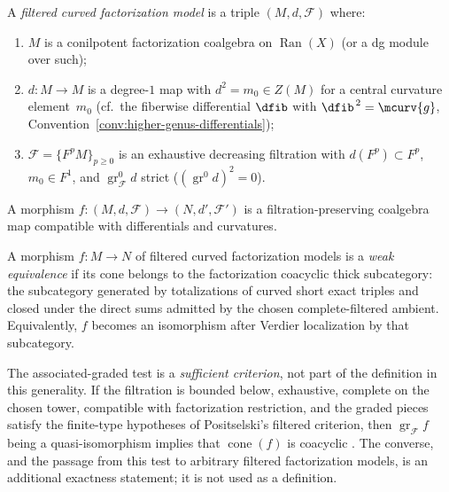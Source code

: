 \begin{definition}
\label{def:filtered-curved-model}
A \emph{filtered curved factorization model} is a triple
$(M, d, \mathcal{F})$ where:
\begin{enumerate}[label=\textup{(\roman*)}]
\item $M$ is a conilpotent factorization coalgebra on $\operatorname{Ran}(X)$
 (or a dg module over such);
\item $d \colon M \to M$ is a degree-$1$ map with
 $d^2 = m_0 \in Z(M)$ for a central curvature element~$m_0$
 (cf.\ the fiberwise differential $\dfib$ with $\dfib^{\,2} = \mcurv{g}$,
 Convention~\textup{\ref{conv:higher-genus-differentials}});
\item $\mathcal{F} = \{F^p M\}_{p \geq 0}$ is an exhaustive
 decreasing filtration with $d(F^p) \subset F^p$,
 $m_0 \in F^1$, and $\operatorname{gr}^0_{\mathcal{F}} d$ strict
 ($(\operatorname{gr}^0 d)^2 = 0$).
\end{enumerate}
A morphism $f \colon (M, d, \mathcal{F}) \to (N, d', \mathcal{F}')$ is a
filtration-preserving coalgebra map compatible with differentials and curvatures.
\end{definition}

\begin{definition}
\label{def:curved-weak-equiv}
A morphism $f \colon M \to N$ of filtered curved factorization models
is a \emph{weak equivalence} if its cone belongs to the factorization
coacyclic thick subcategory: the subcategory generated by
totalizations of curved short exact triples and closed under the
direct sums admitted by the chosen complete-filtered ambient.
Equivalently, $f$ becomes an isomorphism after Verdier localization by
that subcategory.

The associated-graded test is a \emph{sufficient criterion}, not part
of the definition in this generality. If the filtration is
bounded below, exhaustive, complete on the chosen tower, compatible
with factorization restriction, and the graded pieces satisfy the
finite-type hypotheses of Positselski's filtered criterion, then
$\operatorname{gr}_{\mathcal F} f$ being a quasi-isomorphism implies
that $\operatorname{cone}(f)$ is coacyclic
\cite[Proposition~3.5]{Positselski11}. The converse, and the passage
from this test to arbitrary filtered factorization models, is an
additional exactness statement; it is not used as a definition.
\end{definition}

